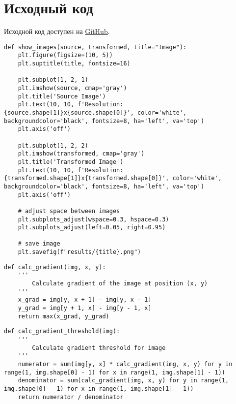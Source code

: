 \appendix
\section{Исходный код}
\label{app:sources}

Исходной код доступен на \href{https://github.com/edelwiw/TechVison_Lab4}{GitHub}.

\begin{lstlisting}[caption={Исзодный код функции для отображения изображений}, label={lst:show_images}]
def show_images(source, transformed, title="Image"):
    plt.figure(figsize=(10, 5))
    plt.suptitle(title, fontsize=16)

    plt.subplot(1, 2, 1)
    plt.imshow(source, cmap='gray')
    plt.title('Source Image')
    plt.text(10, 10, f'Resolution: {source.shape[1]}x{source.shape[0]}', color='white', backgroundcolor='black', fontsize=8, ha='left', va='top')
    plt.axis('off')

    plt.subplot(1, 2, 2)
    plt.imshow(transformed, cmap='gray')
    plt.title('Transformed Image')
    plt.text(10, 10, f'Resolution: {transformed.shape[1]}x{transformed.shape[0]}', color='white', backgroundcolor='black', fontsize=8, ha='left', va='top')
    plt.axis('off')

    # adjust space between images
    plt.subplots_adjust(wspace=0.3, hspace=0.3)
    plt.subplots_adjust(left=0.05, right=0.95)

    # save image
    plt.savefig(f"results/{title}.png")
\end{lstlisting}

\begin{lstlisting}[caption={Исходный код функции для вычисления градиента в точке}, label={lst:calc_gradient}]
def calc_gradient(img, x, y):
    '''
        Calculate gradient of the image at position (x, y)
    '''
    x_grad = img[y, x + 1] - img[y, x - 1]
    y_grad = img[y + 1, x] - img[y - 1, x]
    return max(x_grad, y_grad)
\end{lstlisting}

\begin{lstlisting}[caption={Исходный код функции для вычисления порога бинаризации на основе градиента}, label={lst:calc_gradient_threshold}]
def calc_gradient_threshold(img):
    '''
        Calculate gradient threshold for image 
    '''
    numerator = sum(img[y, x] * calc_gradient(img, x, y) for y in range(1, img.shape[0] - 1) for x in range(1, img.shape[1] - 1))
    denominator = sum(calc_gradient(img, x, y) for y in range(1, img.shape[0] - 1) for x in range(1, img.shape[1] - 1))
    return numerator / denominator
\end{lstlisting}


